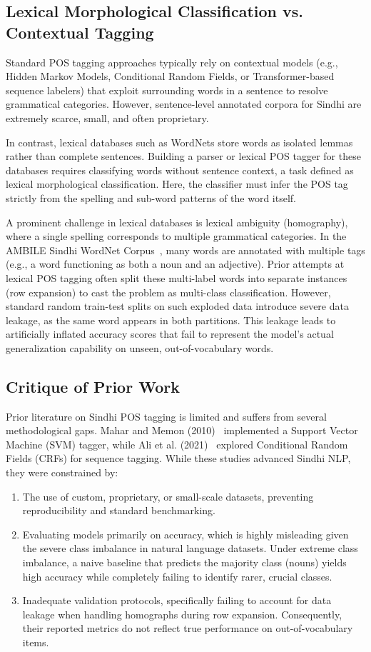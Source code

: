\documentclass[12pt,a4paper]{article}
\begin{document}
\subsection{Lexical Morphological Classification vs. Contextual Tagging}
Standard POS tagging approaches typically rely on contextual models (e.g., Hidden Markov Models, Conditional Random Fields, or Transformer-based sequence labelers) that exploit surrounding words in a sentence to resolve grammatical categories. However, sentence-level annotated corpora for Sindhi are extremely scarce, small, and often proprietary. 

In contrast, lexical databases such as WordNets store words as isolated lemmas rather than complete sentences. Building a parser or lexical POS tagger for these databases requires classifying words without sentence context, a task defined as lexical morphological classification. Here, the classifier must infer the POS tag strictly from the spelling and sub-word patterns of the word itself. 

A prominent challenge in lexical databases is lexical ambiguity (homography), where a single spelling corresponds to multiple grammatical categories. In the AMBILE Sindhi WordNet Corpus~\cite{ref_ambile}, many words are annotated with multiple tags (e.g., a word functioning as both a noun and an adjective). Prior attempts at lexical POS tagging often split these multi-label words into separate instances (row expansion) to cast the problem as multi-class classification. However, standard random train-test splits on such exploded data introduce severe data leakage, as the same word appears in both partitions. This leakage leads to artificially inflated accuracy scores that fail to represent the model's actual generalization capability on unseen, out-of-vocabulary words.

\subsection{Critique of Prior Work}
Prior literature on Sindhi POS tagging is limited and suffers from several methodological gaps. Mahar and Memon (2010)~\cite{ref_mahar} implemented a Support Vector Machine (SVM) tagger, while Ali et al. (2021)~\cite{ref_ali} explored Conditional Random Fields (CRFs) for sequence tagging. While these studies advanced Sindhi NLP, they were constrained by:
\begin{enumerate}
  \item The use of custom, proprietary, or small-scale datasets, preventing reproducibility and standard benchmarking.
  \item Evaluating models primarily on accuracy, which is highly misleading given the severe class imbalance in natural language datasets. Under extreme class imbalance, a naive baseline that predicts the majority class (nouns) yields high accuracy while completely failing to identify rarer, crucial classes.
  \item Inadequate validation protocols, specifically failing to account for data leakage when handling homographs during row expansion. Consequently, their reported metrics do not reflect true performance on out-of-vocabulary items.
\end{enumerate}
\end{document}

